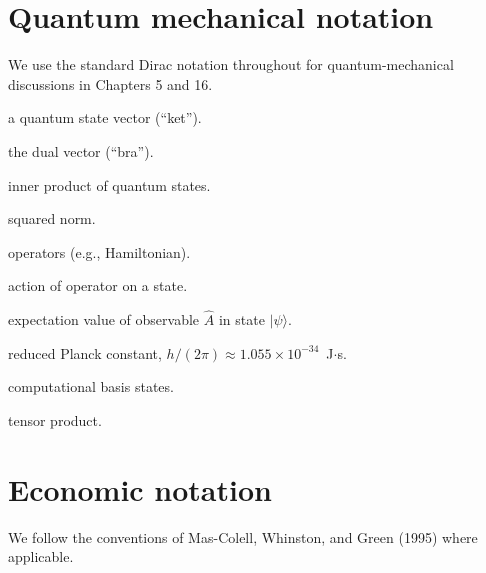 \section*{Quantum mechanical notation}

We use the standard Dirac notation throughout for quantum-mechanical
discussions in Chapters 5 and 16.

\begin{notationbox}
\begin{description}[leftmargin=3cm,style=nextline]
    \item[{$|\psi\rangle$}] a quantum state vector (``ket'').
    \item[{$\langle \psi |$}] the dual vector (``bra'').
    \item[{$\langle \psi | \phi \rangle$}] inner product of quantum states.
    \item[{$|\psi|^2 = \langle \psi | \psi \rangle$}] squared norm.
    \item[{$\hat{A}, \hat{H}$}] operators (e.g., Hamiltonian).
    \item[{$\hat{A} | \psi \rangle$}] action of operator on a state.
    \item[{$\langle \hat{A} \rangle = \langle \psi | \hat{A} | \psi \rangle$}]
        expectation value of observable $\hat{A}$ in state $|\psi\rangle$.
    \item[{$\hbar$}] reduced Planck constant, $h/(2\pi) \approx 1.055 \times 10^{-34}$~J$\cdot$s.
    \item[{$|0\rangle, |1\rangle$}] computational basis states.
    \item[{$\otimes$}] tensor product.
\end{description}
\end{notationbox}

\section*{Economic notation}

We follow the conventions of Mas-Colell, Whinston, and Green (1995)
where applicable.

